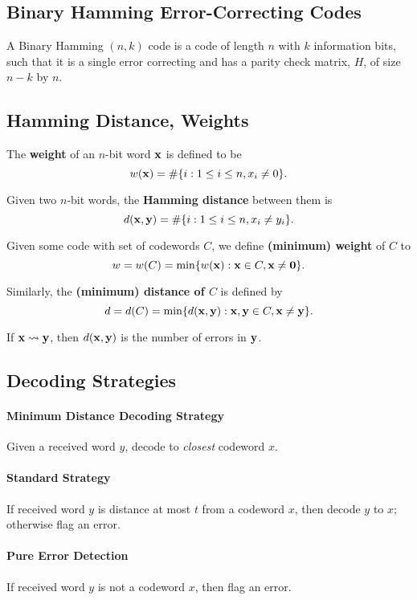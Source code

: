 \subsection{Binary Hamming Error-Correcting Codes}
A Binary Hamming \((n, k)\) code is a code of length \(n\) with \(k\) information bits, such that it is a single error correcting and has a parity check matrix, \(H\), of size \(n - k\) by \(n\).

\subsection{Hamming Distance, Weights}
The \textbf{weight} of an \(n\)-bit word \(\mathbf{x}\) is defined to be
\[w(\mathbf{x}) = \# \{i : 1 \leq i \leq n, x_i \neq 0\}.\]

Given two \(n\)-bit words, the \textbf{Hamming distance} between them is
\[d(\mathbf{x}, \mathbf{y}) = \# \{i : 1 \leq i \leq n, x_i \neq y_i \}.\]

Given some code with set of codewords \(C\), we define \textbf{(minimum) weight} of \(C\) to
\[w = w(C) = \min\{w(\mathbf{x}) : \mathbf{x} \in C, \mathbf{x} \neq \mathbf{0}\}.\]

Similarly, the \textbf{(minimum) distance of \(C\)} is defined by
\[d = d(C) = \min\{d(\mathbf{x}, \mathbf{y}) : \mathbf{x}, \mathbf{y} \in C, \mathbf{x} \neq \mathbf{y} \}.\]

If \(\mathbf{x} \rightsquigarrow \mathbf{y}\), then \(d(\mathbf{x}, \mathbf{y})\) is the number of errors in \(\mathbf{y}\).

\subsection{Decoding Strategies}
\paragraph{Minimum Distance Decoding Strategy}
Given a received word \(y\), decode to \textit{closest} codeword \(x\).

\paragraph{Standard Strategy} If received word \(y\) is distance at most \(t\) from a codeword \(x\), then decode \(y\) to \(x\); otherwise flag an error.

\paragraph{Pure Error Detection}
If received word \(y\) is not a codeword \(x\), then flag an error.

